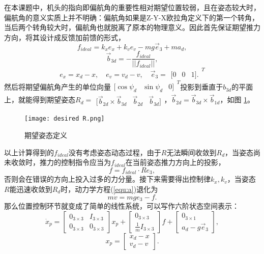     在本课题中，机头的指向即偏航角的重要性相对期望位置较弱，且在姿态较大时，偏航角的意义实质上并不明确：偏航角如果是Z-Y-X欧拉角定义下的第一个转角，当后两个转角较大时，偏航角也就脱离了原本的物理意义。因此首先保证期望推力方向，将其设计成反馈加前馈的形式，
    $$f_{ideal}=k_x e_x+k_v e_v-mg \vec e_3+m a_d,$$
    $$\vec b_{3d}=-\frac{f_{ideal}}{||f_{ideal}||},$$
    $$ e_x=x_d-x ,\quad e_v=v_d-v ,\quad \vec e_3=\begin{matrix}
        [0 & 0 & 1].
    \end{matrix}^T$$
    然后将期望偏航角产生的单位向量$\begin{matrix} [\cos{\psi_d} & \sin{\psi_d} & 0]  \end{matrix}^T$投影到垂直于$b_{3d}$的平面上，就能得到期望姿态$R_d= \begin{matrix} [ \vec b_{2d}\times \vec b_{3d} &\vec b_{2d} & \vec b_{3d}] \end{matrix}$，$\vec b_{2d}=\vec b_{3d} \times \vec b_{1d}$，如图 \ref{fig:2}。
    \begin{figure}[!h]
        \centering
        \texttt{[image: desired R.png]}
        \caption{期望姿态定义}
        \label{fig:2}
      \end{figure}

      以上计算得到的$f_{ideal}$没有考虑姿态动态过程，由于$R$无法瞬间收敛到$R_d$，当姿态尚未收敛时，推力的控制指令应当为$f_{ideal}$在当前姿态推力方向上的投影，
      $$f=f_{ideal}\cdot R e_3,$$否则会在错误的方向上投入过多的力分量。接下来需要得出控制律$k_x , k_v$，当姿态$R$能迅速收敛到$R_d$时，动力学方程(\ref{equ:a})退化为
      $$m \dot v=mge_3-f.$$
      那么位置控制环节就变成了简单的线性系统，可以写作六阶状态空间表示：
      $$\dot x_p=\begin{bmatrix}
        0_{3\times 3} & I_{3\times 3} \\
        0_{3\times 3} & 0_{3\times 3}
    \end{bmatrix} x_p+\begin{bmatrix}
        0_{3\times 3} \\ \frac{1}{m} I_{3\times 3}
    \end{bmatrix} f +\begin{bmatrix}
        0_{3 \times 1} \\ a_d-g \vec e_3 
    \end{bmatrix},$$
    $$x_p=\begin{bmatrix}
        x_d -x \\ v_d -v
    \end{bmatrix}.$$

